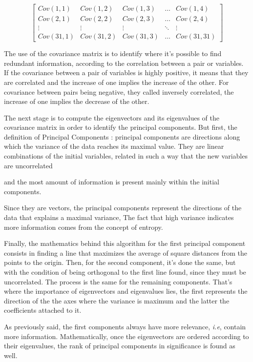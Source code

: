 \documentclass[conference]{IEEEtran}
\begin{document}
\[
\begin{bmatrix}
    Cov(1,1) & Cov(1,2) & Cov(1,3) & \dots  & Cov(1,4) \\
    Cov(2,1) & Cov(2,2) & Cov(2,3) & \dots  & Cov(2,4) \\
    \vdots & \vdots & \vdots & \ddots & \vdots \\
    Cov(31,1) & Cov(31,2) & Cov(31,3) & \dots  & Cov(31,31)
\end{bmatrix}
\]

The use of the covariance matrix is to identify where it's possible to find redundant 
information, according to the correlation between a pair or variables. If the 
covariance between a pair of variables is highly positive, it means that they are 
correlated and the increase of one implies the increase of the other. For covariance 
between pairs being negative, they called inversely correlated, the increase of one 
implies the decrease of the other.

The next stage is to compute the eigenvectors and its eigenvalues of the covariance 
matrix in order to identify the principal components. But first, the definition of 
Principal Components \cite{Ringner}: principal components are directions along which 
the variance of the data reaches its maximal value. They are linear combinations of 
the initial variables, related in such a way that the new variables are uncorrelated 

and the most amount of information is present mainly within the initial components.

Since they are vectors, the principal components represent the directions of the data 
that explains a maximal variance, The fact that high variance indicates more 
information comes from the concept of entropy. 

Finally, the mathematics behind this algorithm for the first principal component 
consists in finding a line that maximizes the average of square distances from the 
points to the origin. Then, for the second component, it's done the same, but with 
the condition of being orthogonal to the first line found, since they must be uncorrelated. The process is the same for the remaining components. That's where the importance of eigenvectors and eigenvalues lies, the first represents the direction of the the axes where the variance is maximum and the latter the coefficients attached to it. 

As previously said, the first components always have more relevance, \textit{i.e}, 
contain more information. Mathematically, once the eigenvectors are ordered 
according to their eigenvalues, the rank of principal components in significance is 
found as well.
\end{document}
